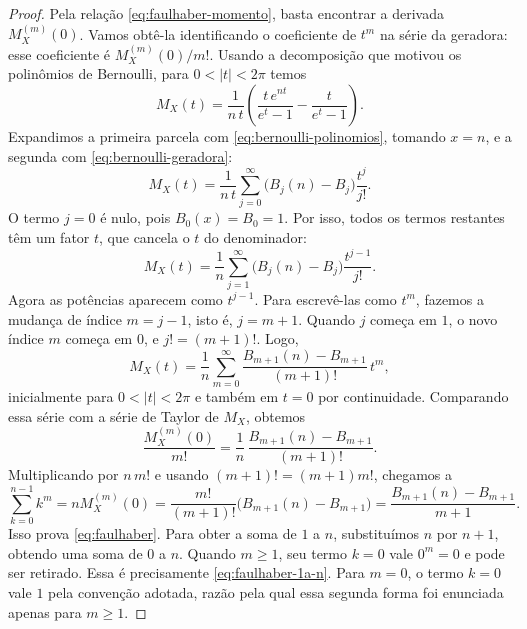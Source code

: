 \documentclass[12pt,portuguese]{article}
\theoremstyle{definition}
\theoremstyle{plainexercise}
\theoremstyle{starredexercise}
\theoremstyle{definition}
\begin{document}
\begin{proof}
Pela relação \eqref{eq:faulhaber-momento}, basta encontrar a derivada
$M_X^{(m)}(0)$. Vamos obtê-la identificando o coeficiente de $t^m$ na
série da geradora: esse coeficiente é $M_X^{(m)}(0)/m!$.
Usando a decomposição que motivou os polinômios de Bernoulli,
para $0<|t|<2\pi$ temos
\[
M_X(t)
=\frac1{n\,t}\left(\frac{t\,e^{nt}}{e^{t}-1}
-\frac{t}{e^{t}-1}\right).
\]
Expandimos a primeira parcela com \eqref{eq:bernoulli-polinomios},
tomando $x=n$, e a segunda com \eqref{eq:bernoulli-geradora}:
\[
M_X(t)=\frac1{n\,t}\sum_{j=0}^{\infty}
\bigl(B_j(n)-B_j\bigr)\frac{t^j}{j!}.
\]
O termo $j=0$ é nulo, pois $B_0(x)=B_0=1$. Por isso, todos os termos
restantes têm um fator $t$, que cancela o $t$ do denominador:
\[
M_X(t)=\frac1n\sum_{j=1}^{\infty}
\bigl(B_j(n)-B_j\bigr)\frac{t^{j-1}}{j!}.
\]
Agora as potências aparecem como $t^{j-1}$. Para escrevê-las como $t^m$,
fazemos a mudança de índice $m=j-1$, isto é, $j=m+1$. Quando $j$ começa
em $1$, o novo índice $m$ começa em $0$, e $j!=(m+1)!$. Logo,
\[
M_X(t)=\frac1n\sum_{m=0}^{\infty}
\frac{B_{m+1}(n)-B_{m+1}}{(m+1)!}\,t^{m},
\]
inicialmente para $0<|t|<2\pi$ e também em $t=0$ por continuidade.
Comparando essa série com a série de Taylor de $M_X$, obtemos
\[
\frac{M_X^{(m)}(0)}{m!}
=\frac1n\,\frac{B_{m+1}(n)-B_{m+1}}{(m+1)!}.
\]
Multiplicando por $n\,m!$ e usando $(m+1)!=(m+1)m!$, chegamos a
\[
\sum_{k=0}^{n-1}k^m
=nM_X^{(m)}(0)
=\frac{m!}{(m+1)!}\bigl(B_{m+1}(n)-B_{m+1}\bigr)
=\frac{B_{m+1}(n)-B_{m+1}}{m+1}.
\]
Isso prova \eqref{eq:faulhaber}. Para obter a soma de $1$ a $n$,
substituímos $n$ por $n+1$, obtendo uma soma de $0$ a $n$. Quando
$m\geqslant1$, seu termo $k=0$ vale $0^m=0$ e pode ser retirado.
Essa é precisamente \eqref{eq:faulhaber-1a-n}. Para $m=0$, o termo
$k=0$ vale $1$ pela convenção adotada, razão pela qual essa segunda
forma foi enunciada apenas para $m\geqslant1$.
\end{proof}
\end{document}
